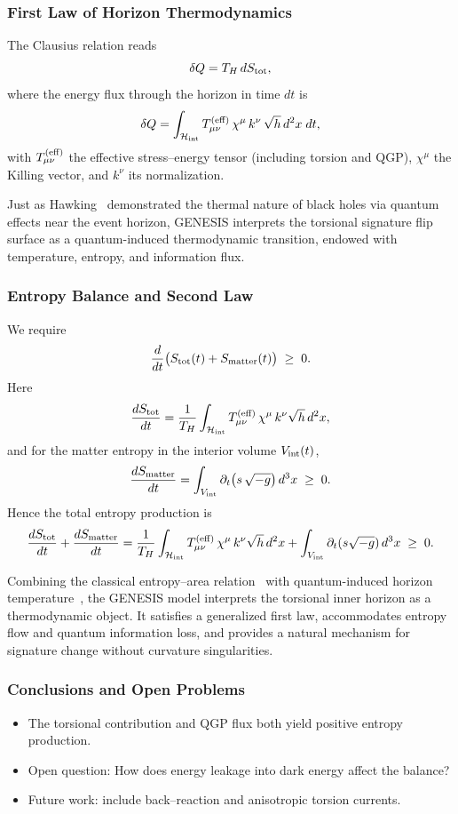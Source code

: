 \documentclass{article}
\begin{document}
\subsubsection{First Law of Horizon Thermodynamics}
The Clausius relation reads
\[
  \delta Q = T_H\,dS_{\rm tot},
\]
where the energy flux through the horizon in time $dt$ is
\[
  \delta Q
  = \int_{\mathcal H_{\rm int}}
    T_{\mu\nu}^{\rm (eff)}\,\chi^\mu\,k^\nu\,
    \sqrt{h}\,d^2x\;dt,
\]
with $T_{\mu\nu}^{\rm (eff)}$ the effective stress–energy tensor (including
torsion and QGP), $\chi^\mu$ the Killing vector, and $k^\nu$ its normalization.


Just as Hawking~\cite{hawking1975} demonstrated the thermal nature of black holes via quantum effects near the event horizon, GENESIS interprets the torsional signature flip surface as a quantum-induced thermodynamic transition, endowed with temperature, entropy, and information flux.



\subsubsection{Entropy Balance and Second Law}
We require
\[
  \frac{d}{dt}\bigl(S_{\rm tot}(t) + S_{\rm matter}(t)\bigr)
  \;\ge\;0.
\]
Here
\[
  \frac{dS_{\rm tot}}{dt}
  = \frac{1}{T_H}
    \int_{\mathcal H_{\rm int}}
      T_{\mu\nu}^{\rm (eff)}\,\chi^\mu\,k^\nu
      \sqrt{h}\,d^2x,
\]
and for the matter entropy in the interior volume $V_{\rm int}(t)$,
\[
  \frac{dS_{\rm matter}}{dt}
  = \int_{V_{\rm int}}
    \partial_t\bigl(s\,\sqrt{-g}\bigr)\,d^3x
  \;\ge\;0.
\]
Hence the total entropy production is
\[
  \frac{dS_{\rm tot}}{dt} + \frac{dS_{\rm matter}}{dt}
  = \frac{1}{T_H}
    \int_{\mathcal H_{\rm int}}
      T_{\mu\nu}^{\rm (eff)}\,\chi^\mu\,k^\nu\sqrt{h}\,d^2x
    + \int_{V_{\rm int}}\partial_t(s\sqrt{-g})\,d^3x
  \;\ge\;0.
\]


Combining the classical entropy–area relation~\cite{bekenstein1973,bekenstein1974} with quantum-induced horizon temperature~\cite{hawking1975}, the GENESIS model interprets the torsional inner horizon as a thermodynamic object.
It satisfies a generalized first law, accommodates entropy flow and quantum information loss, and provides a natural mechanism for signature change without curvature singularities.


\subsubsection{Conclusions and Open Problems}
\begin{itemize}
  \item The torsional contribution and QGP flux both yield positive entropy production.
  \item Open question: How does energy leakage into dark energy affect the balance?
  \item Future work: include back–reaction and anisotropic torsion currents.
\end{itemize}
\end{document}
